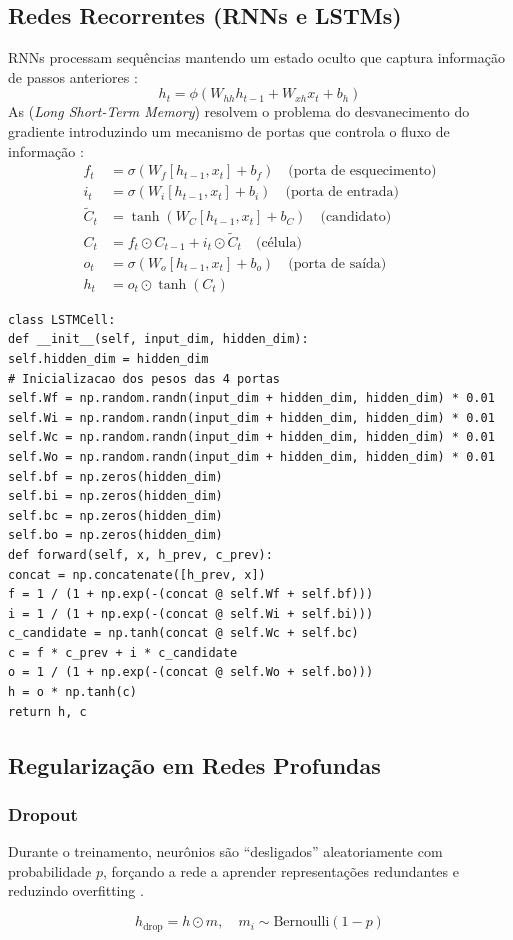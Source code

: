 \subsection{Redes Recorrentes (RNNs e LSTMs)}
RNNs processam sequências mantendo um estado oculto que captura informação
de passos anteriores \cite{goodfellow2016deep}:
\[h_t = \phi(W_{hh} h_{t-1} + W_{xh} x_t + b_h)
\]
As  (\textit{Long Short-Term Memory}) resolvem o problema do
desvanecimento do gradiente introduzindo um mecanismo de portas que controla
o fluxo de informação \cite{hochreiter1997long}:
\begin{align*}
f_t &= \sigma(W_f [h_{t-1}, x_t] + b_f) \quad \text{(porta de esquecimento)} \\
i_t &= \sigma(W_i [h_{t-1}, x_t] + b_i) \quad \text{(porta de entrada)} \\
\tilde{C}_t &= \tanh(W_C [h_{t-1}, x_t] + b_C) \quad \text{(candidato)} \\
C_t &= f_t \odot C_{t-1} + i_t \odot \tilde{C}_t \quad \text{(célula)} \\
o_t &= \sigma(W_o [h_{t-1}, x_t] + b_o) \quad \text{(porta de saída)} \\
h_t &= o_t \odot \tanh(C_t)
\end{align*}
\begin{lstlisting}[style=pythonstyle]
class LSTMCell:
def __init__(self, input_dim, hidden_dim):
self.hidden_dim = hidden_dim
# Inicializacao dos pesos das 4 portas
self.Wf = np.random.randn(input_dim + hidden_dim, hidden_dim) * 0.01
self.Wi = np.random.randn(input_dim + hidden_dim, hidden_dim) * 0.01
self.Wc = np.random.randn(input_dim + hidden_dim, hidden_dim) * 0.01
self.Wo = np.random.randn(input_dim + hidden_dim, hidden_dim) * 0.01
self.bf = np.zeros(hidden_dim)
self.bi = np.zeros(hidden_dim)
self.bc = np.zeros(hidden_dim)
self.bo = np.zeros(hidden_dim)
def forward(self, x, h_prev, c_prev):
concat = np.concatenate([h_prev, x])
f = 1 / (1 + np.exp(-(concat @ self.Wf + self.bf)))
i = 1 / (1 + np.exp(-(concat @ self.Wi + self.bi)))
c_candidate = np.tanh(concat @ self.Wc + self.bc)
c = f * c_prev + i * c_candidate
o = 1 / (1 + np.exp(-(concat @ self.Wo + self.bo)))
h = o * np.tanh(c)
return h, c
\end{lstlisting}
\subsection{Regularização em Redes Profundas}
\subsubsection{Dropout}
\begin{definicao}[Dropout]
Durante o treinamento, neurônios são ``desligados'' aleatoriamente com
probabilidade $p$, forçando a rede a aprender representações redundantes e
reduzindo overfitting \cite{srivastava2014dropout}.
\end{definicao}
\[h_{\text{drop}} = h \odot m, \quad m_i \sim \text{Bernoulli}(1-p)
\]
